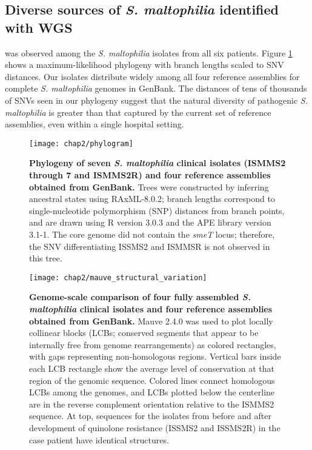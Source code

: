 \subsection{Diverse sources of \emph{S. maltophilia} identified with WGS}

 was observed among the \emph{S. maltophilia} isolates from all six patients. Figure \ref{fig:steno_phylo} shows a maximum-likelihood phylogeny with branch lengths scaled to SNV distances. Our isolates distribute widely among all four reference assemblies for complete \emph{S. maltophilia} genomes in GenBank. The distances of tens of thousands of SNVs seen in our phylogeny suggest that the natural diversity of pathogenic \emph{S. maltophilia} is greater than that captured by the current set of reference assemblies, even within a single hospital setting. 

\begin{figure}[htb]
  \texttt{[image: chap2/phylogram]}               
  \caption[Phylogeny of seven \emph{S. maltophilia} clinical isolates]{\textbf{Phylogeny of seven \emph{S. maltophilia} clinical isolates (ISMMS2 through 7 and ISMMS2R) and four reference assemblies obtained from GenBank.} Trees were constructed by inferring ancestral states using RAxML-8.0.2; branch lengths correspond to single-nucleotide polymorphism (SNP) distances from branch points, and are drawn using R version 3.0.3 and the APE library version 3.1-1. The core genome did not contain the \emph{smeT} locus; therefore, the SNV differentiating ISSMS2 and ISMMSR is not observed in this tree.}
  \label{fig:steno_phylo}
\end{figure}

\begin{figure}[htb]
  \texttt{[image: chap2/mauve\_structural\_variation]}               
  \caption[Genome-scale comparison of four clinical isolates and four reference assemblies]{\textbf{Genome-scale comparison of four fully assembled \emph{S. maltophilia} clinical isolates and four reference assemblies obtained from GenBank.} Mauve 2.4.0 was used to plot locally collinear blocks (LCBs; conserved segments that appear to be internally free from genome rearrangements) as colored rectangles, with gaps representing non-homologous regions. Vertical bars inside each LCB rectangle show the average level of conservation at that region of the genomic sequence. Colored lines connect homologous LCBs among the genomes, and LCBs plotted below the centerline are in the reverse complement orientation relative to the ISMMS2 sequence. At top, sequences for the isolates from before and after development of quinolone resistance (ISSMS2 and ISSMS2R) in the case patient have identical structures.}
  \label{fig:mauve}
\end{figure}

